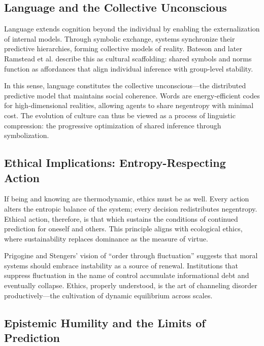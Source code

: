 \documentclass[11pt,a4paper]{article}
\begin{document}
\subsection{Language and the Collective Unconscious}

Language extends cognition beyond the individual by enabling the externalization of internal models.  Through symbolic exchange, systems synchronize their predictive hierarchies, forming collective models of reality.  Bateson and later Ramstead et al. \citep{Ramstead2016CulturalAffordances} describe this as cultural scaffolding: shared symbols and norms function as affordances that align individual inference with group-level stability.  

In this sense, language constitutes the collective unconscious—the distributed predictive model that maintains social coherence.  Words are energy-efficient codes for high-dimensional realities, allowing agents to share negentropy with minimal cost.  The evolution of culture can thus be viewed as a process of linguistic compression: the progressive optimization of shared inference through symbolization.

\subsection{Ethical Implications: Entropy-Respecting Action}

If being and knowing are thermodynamic, ethics must be as well.  Every action alters the entropic balance of the system; every decision redistributes negentropy.  Ethical action, therefore, is that which sustains the conditions of continued prediction for oneself and others.  This principle aligns with ecological ethics, where sustainability replaces dominance as the measure of virtue.

Prigogine and Stengers’ vision of “order through fluctuation” \citep{Prigogine1977SelfOrganizationNonequilibrium} suggests that moral systems should embrace instability as a source of renewal.  Institutions that suppress fluctuation in the name of control accumulate informational debt and eventually collapse.  Ethics, properly understood, is the art of channeling disorder productively—the cultivation of dynamic equilibrium across scales.

\subsection{Epistemic Humility and the Limits of Prediction}
\end{document}
